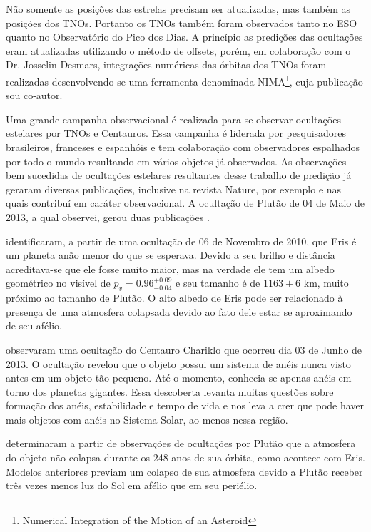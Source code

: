 \documentclass[12pt,a4paper]{report}
\newcommand{\arcmin}{\ensuremath{^{\prime}}}%
\newcommand{\arcsec}{\ensuremath{^{\prime\prime}}}%
\begin{document}
Não somente as posições das estrelas precisam ser atualizadas, mas também as posições dos TNOs. Portanto os TNOs também foram observados tanto no ESO quanto no Observatório do Pico dos Dias. %
A princípio as predições das ocultações eram atualizadas utilizando o método de offsets, porém, em colaboração com o Dr. Josselin Desmars, integrações numéricas das órbitas dos TNOs foram realizadas desenvolvendo-se uma ferramenta denominada NIMA\footnote{Numerical Integration of the Motion of an Asteroid}, cuja publicação \citep{Desmars2015} sou co-autor.


Uma grande campanha observacional é realizada para se observar ocultações estelares por TNOs e Centauros. Essa campanha é liderada por pesquisadores brasileiros, franceses e espanhóis e tem colaboração com observadores espalhados por todo o mundo resultando em vários objetos já observados. As observações bem sucedidas de ocultações estelares resultantes desse trabalho de predição já geraram diversas publicações, inclusive na revista Nature, por exemplo \cite{Sicardy2011} e \cite{BragaRibas2014} nas quais contribuí em caráter observacional. A ocultação de Plutão de 04 de Maio de 2013, a qual observei, gerou duas publicações \citep{Olkin2015, DiasOliveira2015}.

\cite{Sicardy2011} identificaram, a partir de uma ocultação de 06 de Novembro de 2010, que Eris é um planeta anão menor do que se esperava. Devido a seu brilho e distância acreditava-se que ele fosse muito maior, mas na verdade ele tem um albedo geométrico no visível de $p_v=0.96^{+0.09}_{-0.04}$ e seu tamanho é de $1163 \pm 6$ km, muito próximo ao tamanho de Plutão. O alto albedo de Eris pode ser relacionado à presença de uma atmosfera colapsada devido ao fato dele estar se aproximando de seu afélio.

\cite{BragaRibas2014} observaram uma ocultação do Centauro Chariklo que ocorreu dia 03 de Junho de 2013. O ocultação revelou que o objeto possui um sistema de anéis nunca visto antes em um objeto tão pequeno. Até o momento, conhecia-se apenas anéis em torno dos planetas gigantes. Essa descoberta levanta muitas questões sobre formação dos anéis, estabilidade e tempo de vida e nos leva a crer que pode haver mais objetos com anéis no Sistema Solar, ao menos nessa região.

\cite{Olkin2015} determinaram a partir de observações de ocultações por Plutão que a atmosfera do objeto não colapsa durante os 248 anos de sua órbita, como acontece com Eris. Modelos anteriores previam um colapso de sua atmosfera devido a Plutão receber três vezes menos luz do Sol em afélio que em seu periélio.
\end{document}
